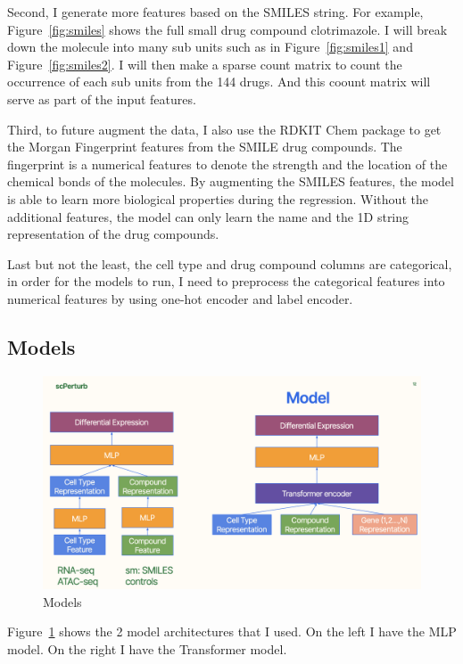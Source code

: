 \documentclass[11pt, oneside]{article}   	%
\begin{document}
Second, I generate more features based on the SMILES string. For example, Figure~\ref{fig:smiles} shows the full small drug compound clotrimazole. I will break down the molecule into many sub units such as in Figure~\ref{fig:smiles1} and Figure~\ref{fig:smiles2}. I will then make a sparse count matrix to count the occurrence of each sub units from the 144 drugs. And this coount matrix will serve as part of the input features. 

Third, to future augment the data, I also use the RDKIT Chem package to get the Morgan Fingerprint features from the SMILE drug compounds. The fingerprint is a numerical features to denote the strength and the location of the chemical bonds of the molecules. By augmenting the SMILES features, the model is able to learn more biological properties during the regression. Without the additional features, the model can only learn the name and the 1D string representation of the drug compounds.

Last but not the least, the cell type and drug compound columns are categorical, in order for the models to run, I need to preprocess the categorical features into numerical features by using one-hot encoder and label encoder. 


\subsection{Models}

\begin{figure}[htbp]
  \centering
  \includegraphics[width=1.0 \textwidth]{models.png}
  \caption{Models}
  \label{fig:models}
\end{figure}

Figure~\ref{fig:models} shows the 2 model architectures that I used. On the left I have the MLP model. On the right I have the Transformer model. 
\end{document}
